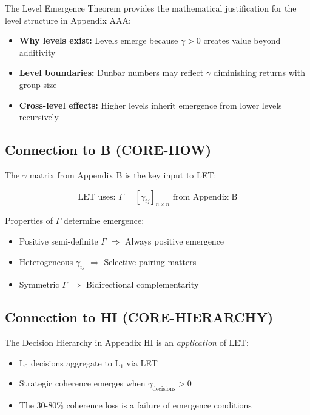 The Level Emergence Theorem provides the mathematical justification for the
level structure in Appendix AAA:

\begin{itemize}
\item \textbf{Why levels exist:} Levels emerge because $\gamma > 0$ creates
value beyond additivity
\item \textbf{Level boundaries:} Dunbar numbers may reflect $\gamma$
diminishing returns with group size
\item \textbf{Cross-level effects:} Higher levels inherit emergence from
lower levels recursively
\end{itemize}

\subsection{Connection to B (CORE-HOW)}

The $\gamma$ matrix from Appendix B is the key input to LET:

\begin{equation}
\text{LET uses: } \Gamma = [\gamma_{ij}]_{n \times n} \text{ from Appendix B}
\end{equation}

Properties of $\Gamma$ determine emergence:
\begin{itemize}
\item Positive semi-definite $\Gamma$ $\Rightarrow$ Always positive emergence
\item Heterogeneous $\gamma_{ij}$ $\Rightarrow$ Selective pairing matters
\item Symmetric $\Gamma$ $\Rightarrow$ Bidirectional complementarity
\end{itemize}

\subsection{Connection to HI (CORE-HIERARCHY)}

The Decision Hierarchy in Appendix HI is an \textit{application} of LET:

\begin{itemize}
\item L$_0$ decisions aggregate to L$_1$ via LET
\item Strategic coherence emerges when $\gamma_{\text{decisions}} > 0$
\item The 30-80\% coherence loss is a failure of emergence conditions
\end{itemize}

